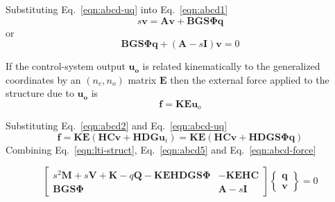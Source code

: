 \documentclass[11pt,openany,twoside]{book}
\numberwithin{equation}{section}		%
\newcommand{\Matrix}[1]{\boldsymbol{#1}}
\newcommand{\Vector}[1]{\boldsymbol{#1}}
\newcommand{\Eqn}[1]{Eq.\ \ref{#1}}  %
\begin{document}
Substituting \Eqn{eqn:abcd-uq} into \Eqn{eqn:abcd1}
\begin{equation}
s\Vector{v} = \Vector{Av} + \Matrix{BGS\Phi} \Vector{q}
\end{equation}
or
\begin{equation}\label{eqn:abcd5}
\Matrix{BGS\Phi} \Vector{q} + \left( \Matrix{A} - s\Matrix{I} \right) \Vector{v} = 0
\end{equation}

If the control-system output $\Vector{u_o}$ is related kinematically to
the generalized coordinates by an $(n_e, n_o)$ matrix $\Matrix{E}$
then the external force applied to the structure due to $\Vector{u_o}$ is
\begin{equation}\label{eqn:lti-f}
\Vector{f} = \Matrix{KE}\Vector{u}_o
\end{equation}

Substituting \Eqn{eqn:abcd2} and \Eqn{eqn:abcd-uq}
\begin{equation}\label{eqn:abcd-force}
\Vector{f} = \Matrix{KE} \left( \Vector{HCv} + \Matrix{HDG}\Vector{u}_i \right) = \Matrix{KE} \left( \Vector{HCv} + \Matrix{HDGS\Phi} \Vector{q} \right)
\end{equation}
Combining \Eqn{eqn:lti-struct}, \Eqn{eqn:abcd5} and \Eqn{eqn:abcd-force}



\begin{equation}\label{eqn:abcd-combtd}
\left[ \begin{array}{cc}
s^2\Matrix{M} + s\Matrix{V} + \Matrix{K} - q\Matrix{Q} -\Matrix{KEHDGS\Phi}    & -\Matrix{KEHC}   \\
\Matrix{BGS\Phi}  &  \Matrix{A} - s\Matrix{I}
\end{array} \right]
\left\{ \begin{array}{c}
\Vector{q} \\
\Vector{v}
\end{array} \right\} = 0
\end{equation}
\end{document}
